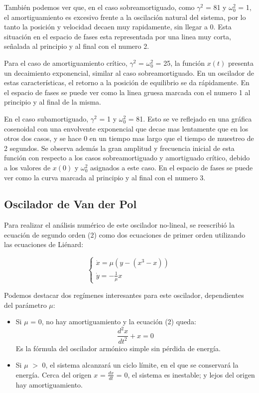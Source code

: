 \documentclass[a4paper,12pt]{article}
\begin{document}
Tambi\'en podemos ver que, en el caso sobreamortiguado, como $\gamma^2$ = 81 y $\omega_0^2$ = 1, el amortiguamiento es excesivo frente a la oscilaci\'on natural del sistema, por lo tanto la posici\'on y velocidad decaen muy rapidamente, sin llegar a 0. Esta situaci\'on en el espacio de fases esta representada por una linea muy corta, se\~nalada al principio y al final con el numero 2.

Para el caso de amortiguamiento cr\'itico, $\gamma^2$ = $\omega_0^2$ = 25, la funci\'on $x(t)$ presenta un decaimiento exponencial, similar al caso sobreamortiguado. En un oscilador de estas caracter\'isticas, el retorno a la posici\'on de equilibrio se da r\'apidamente. En el espacio de fases se puede ver como la linea gruesa marcada con el numero 1 al principio y al final de la misma.

En el caso subamortiguado, $\gamma^2$ = 1 y $\omega_0^2$ = 81. Esto se ve reflejado en una gr\'afica cosenoidal con una envolvente exponencial que decae mas lentamente que en los otros dos casos, y se hace 0 en un tiempo mas largo que el tiempo de muestreo de 2 segundos. \newline
Se observa adem\'as la gran amplitud y frecuencia inicial de esta funci\'on con respecto a los casos sobreamortiguado y amortiguado cr\'itico, debido a los valores de ${x}(0)$ y $\omega_0^2$ asignados a este caso. En el espacio de fases se puede ver como la curva marcada al principio y al final con el numero 3.


\subsection{Oscilador de Van der Pol}

Para realizar el an\'alisis num\'erico de este oscilador no-lineal, se reescribi\'o la ecuaci\'on de segundo orden (2) como dos ecuaciones de primer orden utilizando las ecuaciones de Li\'enard:

$$ \begin{cases} \dot{x} = \mu (y-(x^3-x)) \\ \dot{y} = -\frac{1}{\mu}x \end{cases} $$

Podemos destacar dos reg\'imenes interesantes para este oscilador, dependientes del par\'ametro $\mu$:

\begin{itemize}
\item Si $\mu$ = 0, no hay amortiguamiento y la ecuaci\'on (2) queda:
$$ \frac{d^2 x}{dt^2} + x = 0 $$
Es la f\'ormula del oscilador arm\'onico simple sin p\'erdida de energ\'ia.
\item Si $\mu$ $>$ 0, el sistema alcanzar\'a un ciclo l\'imite, en el que se conservar\'a la energ\'ia. Cerca del origen $x$ = $\frac{dx}{dt}$ = 0, el sistema es inestable; y lejos del origen hay amortiguamiento.
\end{itemize}
\end{document}
